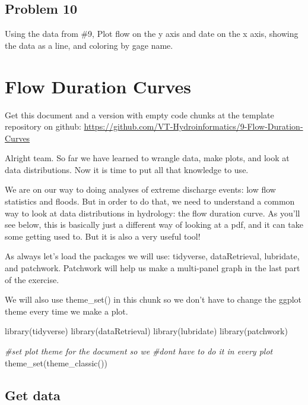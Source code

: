 \documentclass[
]{book}
\newenvironment{Shaded}{\begin{snugshade}}{\end{snugshade}}
\newcommand{\CommentTok}[1]{\textcolor[rgb]{0.56,0.35,0.01}{\textit{#1}}}
\newcommand{\FunctionTok}[1]{\textcolor[rgb]{0.00,0.00,0.00}{#1}}
\newcommand{\NormalTok}[1]{#1}
\begin{document}
\hypertarget{problem-10}{%
\section{Problem 10}\label{problem-10}}

Using the data from \#9, Plot flow on the y axis and date on the x axis, showing the data as a line, and coloring by gage name.

\hypertarget{fdcs}{%
\chapter{Flow Duration Curves}\label{fdcs}}

Get this document and a version with empty code chunks at the template repository on github: \url{https://github.com/VT-Hydroinformatics/9-Flow-Duration-Curves}

Alright team. So far we have learned to wrangle data, make plots, and look at data distributions. Now it is time to put all that knowledge to use.

We are on our way to doing analyses of extreme discharge events: low flow statistics and floods. But in order to do that, we need to understand a common way to look at data distributions in hydrology: the flow duration curve. As you'll see below, this is basically just a different way of looking at a pdf, and it can take some getting used to. But it is also a very useful tool!

As always let's load the packages we will use: tidyverse, dataRetrieval, lubridate, and patchwork. Patchwork will help us make a multi-panel graph in the last part of the exercise.

We will also use theme\_set() in this chunk so we don't have to change the ggplot theme every time we make a plot.

\begin{Shaded}
\begin{Highlighting}[]
\FunctionTok{library}\NormalTok{(tidyverse)}
\FunctionTok{library}\NormalTok{(dataRetrieval)}
\FunctionTok{library}\NormalTok{(lubridate)}
\FunctionTok{library}\NormalTok{(patchwork)}

\CommentTok{\#set plot theme for the document so we }
\CommentTok{\#don\textquotesingle{}t have to do it in every plot}
\FunctionTok{theme\_set}\NormalTok{(}\FunctionTok{theme\_classic}\NormalTok{())}
\end{Highlighting}
\end{Shaded}

\hypertarget{get-data}{%
\section{Get data}\label{get-data}}
\end{document}
